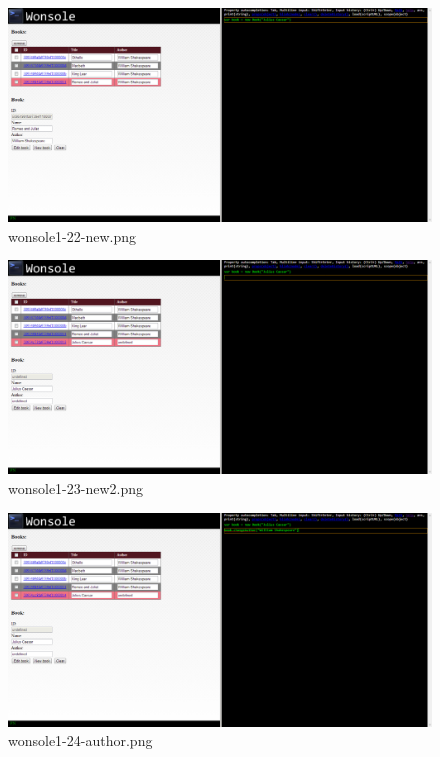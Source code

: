 \begin{figure}
\includegraphics[width=\textwidth]{screenshot/wonsole1-22-new.png}
\caption{wonsole1-22-new.png}
\label{wonsole1-22-new.png}
\end{figure}


\clearpage
\begin{figure}
\includegraphics[width=\textwidth]{screenshot/wonsole1-23-new2.png}
\caption{wonsole1-23-new2.png}
\label{wonsole1-23-new2.png}
\end{figure}


\begin{figure}
\includegraphics[width=\textwidth]{screenshot/wonsole1-24-author.png}
\caption{wonsole1-24-author.png}
\label{wonsole1-24-author.png}
\end{figure}


